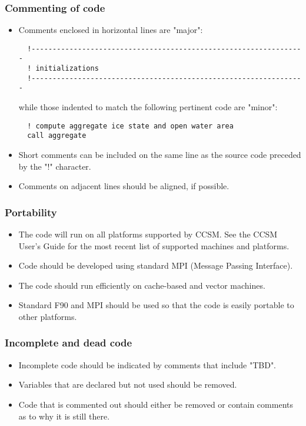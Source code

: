 \subsubsection*{Commenting of code}

\begin{itemize}
  \item  Comments enclosed in horizontal lines are "major":
  \begin{verbatim}
  !-----------------------------------------------------------------
  ! initializations
  !-----------------------------------------------------------------
  \end{verbatim}
  while those indented to match the following pertinent code are "minor":
  \begin{verbatim}
  ! compute aggregate ice state and open water area
  call aggregate
  \end{verbatim}

  \item Short comments can be included on the same line as the source code
        preceded by the "!" character.
  \item Comments on adjacent lines should be aligned, if possible.
\end{itemize}

\subsubsection*{Portability}
\begin{itemize}
  \item  The code will run on all platforms supported by CCSM.  See the CCSM
         User's Guide for the most recent list of supported machines and platforms.
  \item  Code should be developed using standard MPI (Message Passing Interface).
  \item  The code should run efficiently on cache-based and vector machines.
  \item  Standard F90 and MPI should be used so that the code is easily
         portable to other platforms.
\end{itemize}

\subsubsection*{Incomplete and dead code}
\begin{itemize}
  \item Incomplete code should be indicated by comments that include "TBD".
  \item Variables that are declared but not used should be removed.
  \item Code that is commented out should either be removed or contain
        comments as to why it is still there.
\end{itemize}

